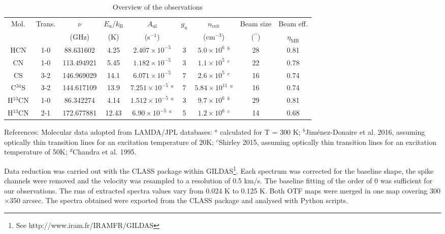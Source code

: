 \documentclass{aa}
\begin{document}
\begin{table*}
\caption{Overview of the observations}             %
\label{table:1}      %
\centering                          %
\begin{tabular}{c c c c c c c c c}        %
\hline\hline                 %
Mol. & Trans. & $\nu$ & $E_\mathrm{u}/k_\mathrm{B}$ &  $A_\mathrm{ul}$ & $g_\mathrm{u}$ & $n_\mathrm{crit}$ &Beam size & Beam eff.\\
 & & (GHz) & (K) & (s$^{-1}$) & & (cm$^{-3}$) & ($^{\prime\prime}$) & $\eta_\mathrm{MB}$\\
\hline                        %
HCN & 1-0 & 88.631602 & 4.25 & $2.407 \times 10^{-5}$  & 3 & $5.0 \times 10^{6}$ $^b$ & 28 & 0.81\\
CN & 1-0 & 113.494921 & 5.45 & $1.182 \times 10^{-5}$ & 3 & $1.1 \times 10^{5}$ $^c$& 22 & 0.78\\
CS & 3-2 & 146.969029 & 14.1 & $6.071 \times 10^{-5}$ & 7 &$2.6 \times 10^{5}$ $^c$ & 16 & 0.74\\
C$^{34}$S & 3-2 & 144.617109 & 13.9 & $7.251 \times 10^{-5}$ $^a$ & 7 & $5.84 \times 10^{11}$ $^a$ & 16 & 0.74\\
H$^{13}$CN & 1-0 & 86.342274 & 4.14 & $1.512 \times 10^{-5}$ $^a$ & 3 & $9.7 \times 10^{6}$ $^b$ & 29 & 0.81\\
H$^{13}$CN & 2-1 & 172.677881 & 12.43 & $6.90\times 10^{-5}$ $^a$ & 5 & $1.2 \times 10^{6}$ $^c$ & 14 & 0.68\\
\hline                                   
\end{tabular}
\begin{flushleft}
References: 
Molecular data adopted from LAMDA/JPL databases: $^a$ calculated for T = 300 K;
$^b$Jim\'enez-Donaire et al. 2016, assuming optically thin transition lines for an excitation temperature of 20K;
$^c$Shirley 2015, assuming optically thin transition lines for an excitation temperature of 50K;
$^d$Chandra et al. 1995.
\end{flushleft}
\end{table*}

Data reduction was carried out with the CLASS package within GILDAS\footnote{See http://www.iram.fr/IRAMFR/GILDAS}. Each spectrum was corrected for the baseline shape, the spike channels were removed and the velocity was resampled to a resolution of 0.5 km/s. The baseline fitting of the order of 0 was sufficient for our observations. The rms of extracted spectra values vary from 0.024 K to 0.125 K. Both OTF maps were merged in one map covering 300$\times$350 arcsec. The spectra obtained were exported from the CLASS package and analysed with Python scripts. 
\end{document}
